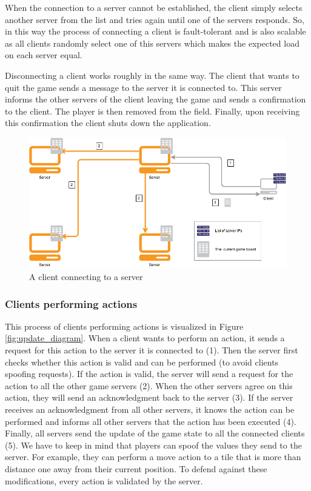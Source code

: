 When the connection to a server cannot be established, the client simply selects another server from the list and tries again until one of the servers responds. 
So, in this way the process of connecting a client is fault-tolerant and is also scalable as all clients randomly select one of this servers which makes the expected load on each server equal.

Disconnecting a client works roughly in the same way. 
The client that wants to quit the game sends a message to the server it is connected to. 
This server informs the other servers of the client leaving the game and sends a confirmation to the client. 
The player is then removed from the field. Finally, upon receiving this confirmation the client shuts down the application.

\begin{figure}[h!]
  \centering
    \includegraphics[width=\textwidth]{diagrams/connecting-client}
    
  \caption{A client connecting to a server}
  \label{fig:connect_diagram}
\end{figure}

\subsubsection{Clients performing actions}
\label{subsubsec:clients_actions}
This process of clients performing actions is visualized in Figure \ref{fig:update_diagram}. 
When a client wants to perform an action, it sends a request for this action to the server it is connected to (1). 
Then the server first checks whether this action is valid and can be performed (to avoid clients spoofing requests). 
If the action is valid, the server will send a request for the action to all the other game servers (2). 
When the other servers agree on this action, they will send an acknowledgment back to the server (3). 
If the server receives an acknowledgment from all other servers, it knows the action can be performed and informs all other servers that the action has been executed (4). 
Finally, all servers send the update of the game state to all the connected clients (5). 
We have to keep in mind that players can spoof the values they send to the server. 
For example, they can perform a move action to a tile that is more than distance one away from their current position. 
To defend against these modifications, every action is validated by the server.

